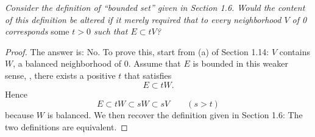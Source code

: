 \textit{%
Consider the definition of ``bounded set'' given in Section 1.6. Would the content of this definition be altered if it merely %
required that to every neighborhood $V$ of 0 corresponds }some\textit{ $t>0$ such that $E\subset tV$?}
%
\begin{proof}
The answer is: No. To prove this, start from (a) of Section 1.14: $V$ contains $W$, a balanced neighborhood of $0$. %
%
Assume that $E$ is bounded in this weaker sense, \ie, there exists a positive $t$ that satisfies %
%
\begin{equation}%
  E\subset tW.
\end{equation}
%
Hence  
%
\begin{equation} 
  E\subset tW \subset sW \subset sV \qquad (s>t)
\end{equation}
%
because $W$ is balanced. We then recover the definition given in Section 1.6: The two definitions are equivalent.
\end{proof}
